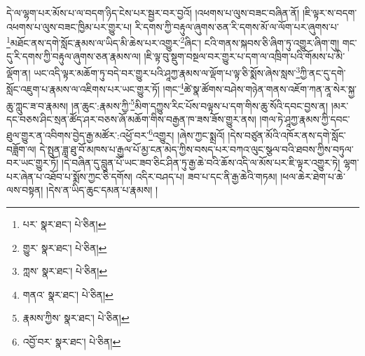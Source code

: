 དེ་ལ་ལྷག་པར་མོས་པ་ལ་བདག་ཉིད་ངེས་པར་སྦྱར་བར་བྱའོ། །འཕགས་པ་ལུས་བཟང་བཞིན་ནོ། །ཇི་ལྟར་ས་བདག་འཕགས་པ་ལུས་བཟང་ཁྱིམ་པར་གྱུར་པ། རི་དགས་ཀྱི་བརྟུལ་ཞུགས་ཅན་རི་དགས་མོ་ལ་ལོག་པར་ཞུགས་པ་\footnote{པར་  སྣར་ཐང་།  པེ་ཅིན། }མཐོང་ནས་དགེ་སློང་རྣམས་ལ་ཡིད་མི་ཆེས་པར་འགྱུར་\footnote{གྱུར་  སྣར་ཐང་།  པེ་ཅིན། }ཞིང་། ངའི་གནས་སྐབས་ཅི་ཞིག་ཏུ་འགྱུར་ཞིག་གུ། གང་དུ་རི་དགས་ཀྱི་བརྟུལ་ཞུགས་ཅན་རྣམས་ལ། །ཇི་ལྟ་བུ་སྡུག་བསྔལ་བར་གྱུར་པ་དག་ལ་འཁྲིག་པའི་གོམས་པ་མི་ལྡོག་ན། ཡང་འདི་ལྟར་མཆོག་ཏུ་བདེ་བར་གྱུར་པའི་ཤཱཀྱ་རྣམས་ལ་ལྡོག་པ་ལྟ་ཅི་སྨོས་ཞེས་སླས་\footnote{ཀླས་  སྣར་ཐང་།  པེ་ཅིན། }ཀྱི་ནང་དུ་དགེ་སློང་འཇུག་པ་རྣམས་ལ་འཇིགས་པར་ཡང་གྱུར་ཏོ། །གང་\footnote{གནའ་  སྣར་ཐང་།  པེ་ཅིན། }ཚེ་སྣ་ཚོགས་བཤེས་གཉེན་གནས་འཇོག་ཀན་ནཱ་སེར་སྐྱ་ཆུ་ཀླུང་ཟ་བ་རྣམས། །ན་ཆུང་:རྣམས་ཀྱི་\footnote{རྣམས་ཀྱིས་  སྣར་ཐང་།  པེ་ཅིན། }མིག་དཀྱུས་རིང་པོས་བལྟས་པ་དག་གིས་ཆུ་སོའི་དབང་བྱས་ན། །མར་དང་བཅས་ཤིང་སྲན་ཚོད་ཤར་བཅས་ཞོ་མཆོག་གིས་བརྒྱན་ཁ་ཟས་ཟོས་གྱུར་ནས། །གལ་ཏེ་ཤཱཀྱ་རྣམས་ཀྱི་དབང་ཐུལ་གྱུར་ན་འབིགས་བྱེད་རྒྱ་མཚོར་:འཕྱོ་བར་\footnote{འབྱོ་བར་  སྣར་ཐང་།  པེ་ཅིན། }འགྱུར། །ཞེས་ཀྱང་སྨྲའོ། །དེས་བཙུན་མོའི་འཁོར་ནས་དགེ་སློང་བཟློག་ལ། དེ་སྤུན་ཟླ་ཐུ་བོ་མཁས་པ་རྒྱལ་པོ་མྱ་ངན་མེད་ཀྱིས་བསད་པར་བཀའ་ལུང་སྩལ་བའི་ཐབས་ཀྱིས་བཏུལ་བར་ཡང་གྱུར་ཏོ། །དེ་བཞིན་དུ་བླུན་པོ་ཡང་ཟབ་ཅིང་ཤིན་ཏུ་རྒྱ་ཆེ་བའི་ཆོས་འདི་ལ་མོས་པར་ཇི་ལྟར་འགྱུར་ཏེ། ལྷག་པར་ཞེན་པ་འཐོབ་པ་སྨོས་ཀྱང་ཅི་དགོས། འདིར་བཤད་པ། ཟབ་པ་དང་ནི་རྒྱ་ཆེའི་གཏམ། །ཕལ་ཆེར་ཐེག་པ་ཆེ་ལས་བསྟན། །དེས་ན་ཡིད་ཆུང་དམན་པ་རྣམས། །
